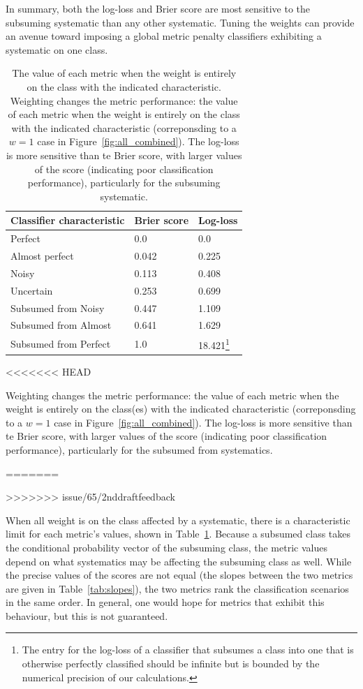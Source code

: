 In summary, both the log-loss and Brier score are most sensitive to the subsuming systematic than any other systematic.
Tuning the weights can provide an avenue toward imposing a global metric penalty classifiers exhibiting a systematic on one class.

\begin{table}[]
\begin{tabular}{lll}
Classifier characteristic & Brier score & Log-loss\\
\hline
Perfect & 0.0 & 0.0\\
Almost perfect & 0.042 & 0.225\\
Noisy & 0.113 & 0.408\\
Uncertain & 0.253 & 0.699\\
Subsumed from Noisy & 0.447 & 1.109\\
Subsumed from Almost & 0.641 & 1.629\\
Subsumed from Perfect & 1.0 & 18.421\footnote{The entry for the log-loss of a classifier that subsumes a class into one that is otherwise perfectly classified should be infinite but is bounded by the numerical precision of our calculations.}
\end{tabular}
<<<<<<< HEAD
\caption{Weighting changes the metric performance: the value of each metric when the weight is entirely on the class(es) with the indicated characteristic (correponsding to a $w=1$ case in Figure~\ref{fig:all_combined}). The log-loss is more sensitive than te Brier score, with larger values of the score (indicating poor classification performance), particularly for the subsumed from systematics.}
=======
\caption{
The value of each metric when the weight is entirely on the class with the indicated characteristic.
Weighting changes the metric performance: the value of each metric when the weight is entirely on the class with the indicated characteristic (correponsding to a $w=1$ case in Figure~\ref{fig:all_combined}).
The log-loss is more sensitive than te Brier score, with larger values of the score (indicating poor classification performance), particularly for the subsuming systematic.
}
>>>>>>> issue/65/2nddraftfeedback
\label{tab:extents}
\end{table}

When all weight is on the class affected by a systematic, there is a characteristic limit for each metric's values, shown in Table~\ref{tab:extents}. Because a subsumed class takes the conditional probability vector of the subsuming class, the metric values depend on what systematics may be affecting the subsuming class as well. While the precise values of the scores are not equal (the slopes between the two metrics are given in Table~\ref{tab:slopes}), the two metrics rank the classification scenarios in the same order.
In general, one would hope for metrics that exhibit this behaviour, but this is not guaranteed.

